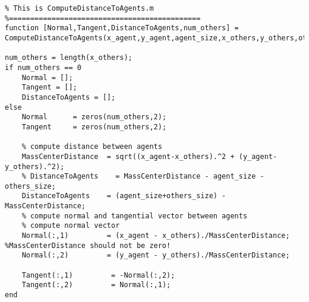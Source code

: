 \lstset{basicstyle=\footnotesize\ttfamily}
    
\begin{lstlisting}[breaklines]
%=============================================
% This is ComputeDistanceToAgents.m
%=============================================
function [Normal,Tangent,DistanceToAgents,num_others] = ComputeDistanceToAgents(x_agent,y_agent,agent_size,x_others,y_others,others_size)

num_others = length(x_others);
if num_others == 0
    Normal = [];
    Tangent = [];
    DistanceToAgents = [];
else
    Normal      = zeros(num_others,2);
    Tangent     = zeros(num_others,2);

    % compute distance between agents
    MassCenterDistance  = sqrt((x_agent-x_others).^2 + (y_agent-y_others).^2);
    % DistanceToAgents    = MassCenterDistance - agent_size - others_size;
    DistanceToAgents    = (agent_size+others_size) - MassCenterDistance;
    % compute normal and tangential vector between agents
    % compute normal vector
    Normal(:,1)         = (x_agent - x_others)./MassCenterDistance;  %MassCenterDistance should not be zero!
    Normal(:,2)         = (y_agent - y_others)./MassCenterDistance;

    Tangent(:,1)         = -Normal(:,2);
    Tangent(:,2)         = Normal(:,1);
end
\end{lstlisting}
    
